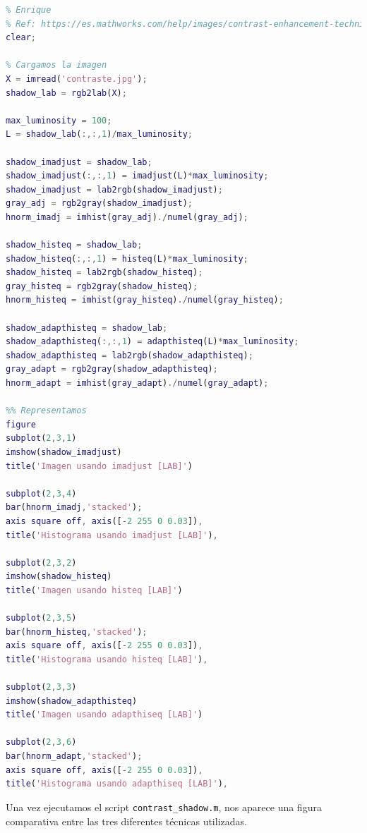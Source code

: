 \documentclass[12pt]{article}
\begin{document}
	\begin{lstlisting}[language=Matlab, caption={Implementanción contraste utilizando \texttt{imadjust}, \texttt{histeq} y \texttt{adapthiseq} en \texttt{LAB}}]
% 2 - Contraste 
% Enrique
% Ref: https://es.mathworks.com/help/images/contrast-enhancement-techniques.html
clear;

% Cargamos la imagen
X = imread('contraste.jpg'); 
shadow_lab = rgb2lab(X);

max_luminosity = 100; 
L = shadow_lab(:,:,1)/max_luminosity;

shadow_imadjust = shadow_lab; 
shadow_imadjust(:,:,1) = imadjust(L)*max_luminosity; 
shadow_imadjust = lab2rgb(shadow_imadjust);
gray_adj = rgb2gray(shadow_imadjust);
hnorm_imadj = imhist(gray_adj)./numel(gray_adj);

shadow_histeq = shadow_lab; 
shadow_histeq(:,:,1) = histeq(L)*max_luminosity; 
shadow_histeq = lab2rgb(shadow_histeq);
gray_histeq = rgb2gray(shadow_histeq);
hnorm_histeq = imhist(gray_histeq)./numel(gray_histeq);

shadow_adapthisteq = shadow_lab; 
shadow_adapthisteq(:,:,1) = adapthisteq(L)*max_luminosity; 
shadow_adapthisteq = lab2rgb(shadow_adapthisteq);
gray_adapt = rgb2gray(shadow_adapthisteq);
hnorm_adapt = imhist(gray_adapt)./numel(gray_adapt);

%% Representamos
figure
subplot(2,3,1)
imshow(shadow_imadjust)
title('Imagen usando imadjust [LAB]')

subplot(2,3,4)
bar(hnorm_imadj,'stacked'); 
axis square off, axis([-2 255 0 0.03]), 
title('Histograma usando imadjust [LAB]'), 

subplot(2,3,2)
imshow(shadow_histeq)
title('Imagen usando histeq [LAB]')

subplot(2,3,5)
bar(hnorm_histeq,'stacked'); 
axis square off, axis([-2 255 0 0.03]), 
title('Histograma usando histeq [LAB]'), 

subplot(2,3,3)
imshow(shadow_adapthisteq)
title('Imagen usando adapthiseq [LAB]')

subplot(2,3,6)
bar(hnorm_adapt,'stacked'); 
axis square off, axis([-2 255 0 0.03]), 
title('Histograma usando adapthiseq [LAB]'), 
	\end{lstlisting}
	
	\vspace{10px}

	\noindent Una vez ejecutamos el script \texttt{contrast\_shadow.m}, nos aparece una figura comparativa entre las tres diferentes técnicas utilizadas.
	
\end{document}
